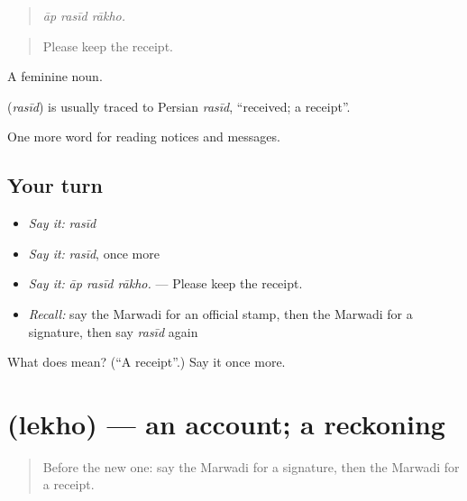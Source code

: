 \begin{quote}
  
\end{quote}

\begin{quote}
\emph{āp rasīd rākho.}
\end{quote}

\begin{quote}
Please keep the receipt.
\end{quote}

A feminine noun.

\begin{cousinweb}
\textbf{} (\emph{rasīd}) is usually traced to Persian \emph{rasīd}, \textquotedblleft{}received; a receipt\textquotedblright{}.
\end{cousinweb}

\begin{grammarlens}[title={What you've built}]
One more word for reading notices and messages.
\end{grammarlens}

\subsection*{Your turn}
\begin{itemize}
\raggedright
  \item \emph{Say it:} \emph{rasīd}
  \item \emph{Say it:} \emph{rasīd}, once more
  \item \emph{Say it:} \emph{āp rasīd rākho.} — Please keep the receipt.
  \item \emph{Recall:} say the Marwadi for an official stamp, then the Marwadi for a signature, then say \emph{rasīd} again
\end{itemize}

\begin{tcolorbox}[breakable,colback=teal!4,colframe=teal!35!black,title={Before you move on}]
What does  mean? (\textquotedblleft{}A receipt\textquotedblright{}.) Say it once more.
\end{tcolorbox}
\section[\texorpdfstring{\mw{लेखो} (lekho)}{लेखो (lekho)}]{ (lekho) — an account; a reckoning}

\label{lesson:MW-C199-lekho}



\begin{quote}
Before the new one: say the Marwadi for a signature, then the Marwadi for a receipt.
\end{quote}

